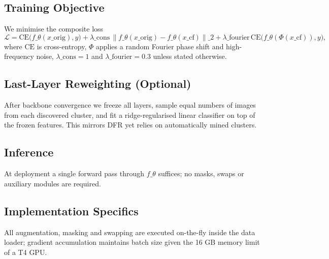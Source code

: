 \documentclass{article}
\begin{document}
\subsection{Training Objective}
We minimise the composite loss
\[
\mathcal{L} = \mathrm{CE}\big(f\_{\theta}(x\_{\text{orig}}), y\big) + \lambda\_{\text{cons}}\, \big\|f\_{\theta}(x\_{\text{orig}}) - f\_{\theta}(x\_{\text{cf}})\big\|\_2 + \lambda\_{\text{fourier}}\, \mathrm{CE}\big(f\_{\theta}(\Phi(x\_{\text{cf}})), y\big),
\]
where \(\mathrm{CE}\) is cross-entropy, \(\Phi\) applies a random Fourier phase shift and high-frequency noise, \(\lambda\_{\text{cons}} = 1\) and \(\lambda\_{\text{fourier}} = 0.3\) unless stated otherwise.

\subsection{Last-Layer Reweighting (Optional)}
After backbone convergence we freeze all layers, sample equal numbers of images from each discovered cluster, and fit a ridge-regularised linear classifier on top of the frozen features. This mirrors DFR yet relies on automatically mined clusters.

\subsection{Inference}
At deployment a single forward pass through \(f\_{\theta}\) suffices; no masks, swaps or auxiliary modules are required.

\subsection{Implementation Specifics}
All augmentation, masking and swapping are executed on-the-fly inside the data loader; gradient accumulation maintains batch size given the 16 GB memory limit of a T4 GPU.
\end{document}
